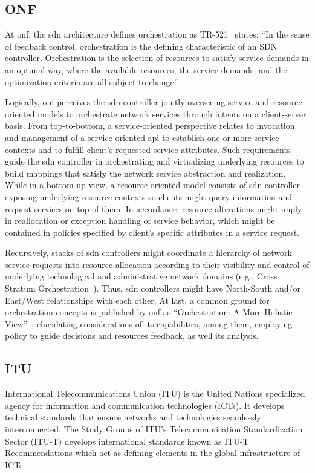 \subsection{ONF}
At \gls{onf}, the \gls{sdn} architecture defines orchestration as TR-521~\cite{ONF:Orch:2017} states: ``In the sense of feedback control, orchestration is the defining characteristic of an SDN controller. Orchestration is the selection of resources to satisfy service demands in an optimal way, where the available resources, the service demands, and the optimization criteria are all subject to change''.  

Logically, \gls{onf} perceives the \gls{sdn} controller jointly overseeing service and resource-oriented models to orchestrate network services through intents on a client-server basis. From top-to-bottom, a service-oriented perspective relates to invocation and management of a service-oriented \gls{api} to establish one or more service contexts and to fulfill client's requested service attributes. 
Such requirements guide the \gls{sdn} controller in orchestrating and virtualizing underlying resources to build mappings that satisfy the network service abstraction and realization. While in a bottom-up view, a resource-oriented model consists of \gls{sdn} controller exposing underlying resource contexts so clients might query information and request services on top of them. In accordance, resource alterations might imply in reallocation or exception handling of service behavior, which might be contained in policies specified by client's specific attributes in a service request.

Recursively, stacks of \gls{sdn} controllers might coordinate a hierarchy of network service requests into resource allocation according to their visibility and control of underlying technological and administrative network domains (e.g., Cross Stratum Orchestration~\cite{ONF:CSO:2017}). Thus, \gls{sdn} controllers might have North-South and/or East/West relationships with each other. At last, a common ground for orchestration concepts is published by \gls{onf} as ``Orchestration: A More Holistic View''~\cite{ONF:Orch:2017}, elucidating considerations of its capabilities, among them, employing policy to guide decisions and resources feedback, as well its analysis.  


\subsection {ITU}
International Telecommunications Union (ITU) is the United Nations specialized agency for information and communication technologies (ICTs). It develops technical standards that ensure networks and technologies seamlessly interconnected. The Study Groups of ITU’s Telecommunication Standardization Sector (ITU-T) develops international standards known as ITU-T Recommendations which act as defining elements in the global infrastructure of ICTs~\cite{ITUITU:World}.

